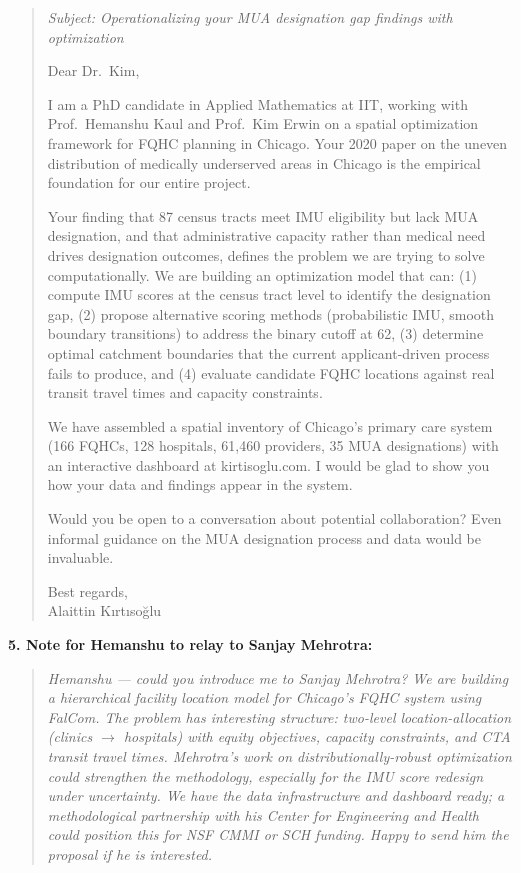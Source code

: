 \documentclass[11pt]{article}
\begin{document}
\begin{quote}
\textit{Subject: Operationalizing your MUA designation gap findings with optimization}

Dear Dr.\ Kim,

I am a PhD candidate in Applied Mathematics at IIT, working with Prof.\ Hemanshu Kaul and Prof.\ Kim Erwin on a spatial optimization framework for FQHC planning in Chicago. Your 2020 paper on the uneven distribution of medically underserved areas in Chicago is the empirical foundation for our entire project.

Your finding that 87 census tracts meet IMU eligibility but lack MUA designation, and that administrative capacity rather than medical need drives designation outcomes, defines the problem we are trying to solve computationally. We are building an optimization model that can: (1) compute IMU scores at the census tract level to identify the designation gap, (2) propose alternative scoring methods (probabilistic IMU, smooth boundary transitions) to address the binary cutoff at 62, (3) determine optimal catchment boundaries that the current applicant-driven process fails to produce, and (4) evaluate candidate FQHC locations against real transit travel times and capacity constraints.

We have assembled a spatial inventory of Chicago's primary care system (166 FQHCs, 128 hospitals, 61,460 providers, 35 MUA designations) with an interactive dashboard at kirtisoglu.com. I would be glad to show you how your data and findings appear in the system.

Would you be open to a conversation about potential collaboration? Even informal guidance on the MUA designation process and data would be invaluable.

Best regards,\\
Alaittin K{\i}rt{\i}so\u{g}lu
\end{quote}

\bigskip

\textbf{5. Note for Hemanshu to relay to Sanjay Mehrotra:}

\begin{quote}
\textit{Hemanshu --- could you introduce me to Sanjay Mehrotra? We are building a hierarchical facility location model for Chicago's FQHC system using FalCom. The problem has interesting structure: two-level location-allocation (clinics $\to$ hospitals) with equity objectives, capacity constraints, and CTA transit travel times. Mehrotra's work on distributionally-robust optimization could strengthen the methodology, especially for the IMU score redesign under uncertainty. We have the data infrastructure and dashboard ready; a methodological partnership with his Center for Engineering and Health could position this for NSF CMMI or SCH funding. Happy to send him the proposal if he is interested.}
\end{quote}
\end{document}
